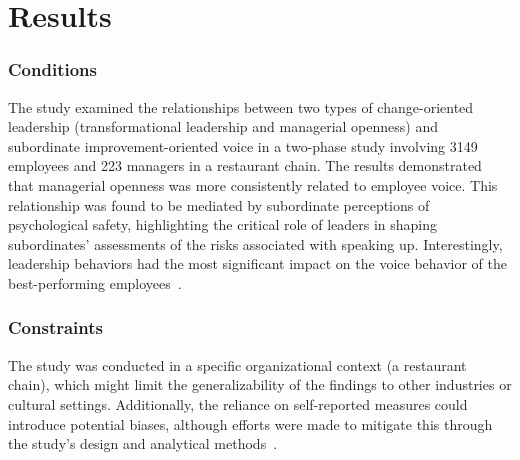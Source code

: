 \documentclass[runningheads]{llncs}
\begin{document}
\section{Results}
 
\subsubsection{Conditions}
The study examined the relationships between two types of change-oriented leadership (transformational leadership and managerial openness) and subordinate improvement-oriented voice in a two-phase study involving 3149 employees and 223 managers in a restaurant chain. The results demonstrated that managerial openness was more consistently related to employee voice. This relationship was found to be mediated by subordinate perceptions of psychological safety, highlighting the critical role of leaders in shaping subordinates' assessments of the risks associated with speaking up. Interestingly, leadership behaviors had the most significant impact on the voice behavior of the best-performing employees~\cite{detert2007leadership}.
\subsubsection{Constraints}
The study was conducted in a specific organizational context (a restaurant chain), which might limit the generalizability of the findings to other industries or cultural settings. Additionally, the reliance on self-reported measures could introduce potential biases, although efforts were made to mitigate this through the study's design and analytical methods~\cite{detert2007leadership}.
\end{document}
